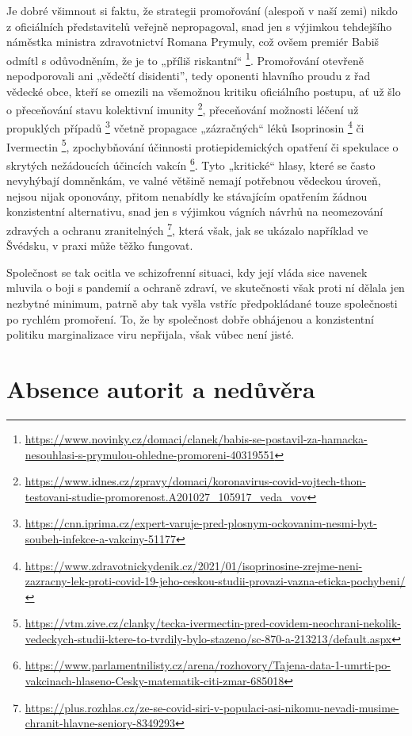 Je dobré všimnout si faktu, že strategii promořování (alespoň v naší zemi) nikdo z oficiálních představitelů veřejně nepropagoval, snad jen s výjimkou tehdejšího náměstka ministra zdravotnictví Romana Prymuly, což ovšem premiér Babiš odmítl s odůvodněním, že je to „příliš riskantní“ \footnote{\url{https://www.novinky.cz/domaci/clanek/babis-se-postavil-za-hamacka-nesouhlasi-s-prymulou-ohledne-promoreni-40319551}}. Promořování otevřeně nepodporovali ani „vědečtí disidenti”, tedy oponenti hlavního proudu z řad vědecké obce, kteří se omezili na všemožnou kritiku oficiálního postupu, ať už šlo o přeceňování stavu kolektivní imunity \footnote{\url{https://www.idnes.cz/zpravy/domaci/koronavirus-covid-vojtech-thon-testovani-studie-promorenost.A201027_105917_veda_vov}}, přeceňování možnosti léčení už propuklých případů \footnote{\url{https://cnn.iprima.cz/expert-varuje-pred-plosnym-ockovanim-nesmi-byt-soubeh-infekce-a-vakciny-51177}} včetně propagace „zázračných“ léků Isoprinosin \footnote{\url{https://www.zdravotnickydenik.cz/2021/01/isoprinosine-zrejme-neni-zazracny-lek-proti-covid-19-jeho-ceskou-studii-provazi-vazna-eticka-pochybeni/}} či Ivermectin \footnote{\url{https://vtm.zive.cz/clanky/tecka-ivermectin-pred-covidem-neochrani-nekolik-vedeckych-studii-ktere-to-tvrdily-bylo-stazeno/sc-870-a-213213/default.aspx}}, zpochybňování účinnosti protiepidemických opatření \cite{KomarekStraka2021} či spekulace o skrytých nežádoucích účincích vakcín \footnote{\url{https://www.parlamentnilisty.cz/arena/rozhovory/Tajena-data-1-umrti-po-vakcinach-hlaseno-Cesky-matematik-citi-zmar-685018}}. Tyto „kritické“ hlasy, které se často nevyhýbají domněnkám, ve valné většině nemají potřebnou vědeckou úroveň, nejsou nijak oponovány, přitom nenabídly ke stávajícím opatřením žádnou konzistentní alternativu, snad jen s výjimkou vágních návrhů na neomezování zdravých a ochranu zranitelných \footnote{\url{https://plus.rozhlas.cz/ze-se-covid-siri-v-populaci-asi-nikomu-nevadi-musime-chranit-hlavne-seniory-8349293}}, která však, jak se ukázalo například ve Švédsku, v praxi může těžko fungovat. 

Společnost se tak ocitla ve schizofrenní situaci, kdy její vláda sice navenek mluvila o boji s pandemií a ochraně zdraví, ve skutečnosti však proti ní dělala jen nezbytné minimum, patrně aby tak vyšla vstříc předpokládané touze společnosti po rychlém promoření. To, že by společnost dobře obhájenou a konzistentní politiku marginalizace viru nepřijala, však vůbec není jisté.

\section*{Absence autorit a nedůvěra}

